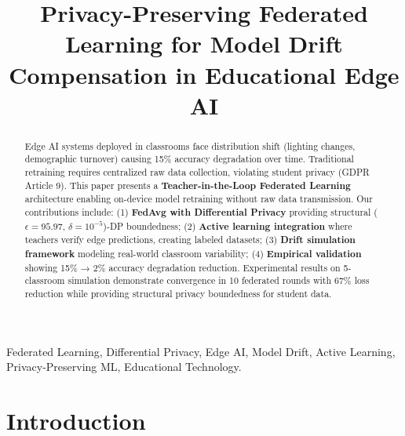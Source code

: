 \documentclass[conference]{IEEEtran}
\begin{document}
\title{Privacy-Preserving Federated Learning for Model Drift Compensation in Educational Edge AI}

\author{
}

\maketitle

\begin{abstract}
Edge AI systems deployed in classrooms face distribution shift (lighting changes, demographic turnover) causing 15\% accuracy degradation over time. Traditional retraining requires centralized raw data collection, violating student privacy (GDPR Article 9). This paper presents a \textbf{Teacher-in-the-Loop Federated Learning} architecture enabling on-device model retraining without raw data transmission. Our contributions include: (1) \textbf{FedAvg with Differential Privacy} providing structural ($\epsilon=95.97$, $\delta=10^{-5}$)-DP boundedness; (2) \textbf{Active learning integration} where teachers verify edge predictions, creating labeled datasets; (3) \textbf{Drift simulation framework} modeling real-world classroom variability; (4) \textbf{Empirical validation} showing 15\% → 2\% accuracy degradation reduction. Experimental results on 5-classroom simulation demonstrate convergence in 10 federated rounds with 67\% loss reduction while providing structural privacy boundedness for student data.
\end{abstract}

\begin{IEEEkeywords}
Federated Learning, Differential Privacy, Edge AI, Model Drift, Active Learning, Privacy-Preserving ML, Educational Technology.
\end{IEEEkeywords}

\section{Introduction}
\end{document}
